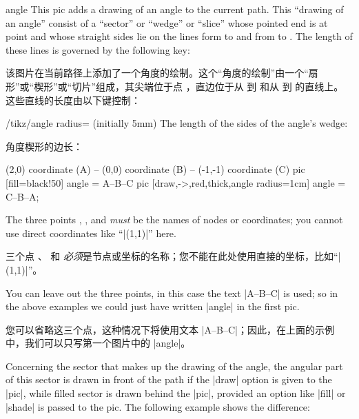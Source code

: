 \begin{pictype}{angle}{}
    This pic adds a drawing of an angle to the current path. This ``drawing of
    an angle'' consist of a ``sector'' or ``wedge'' or ``slice'' whose pointed
    end is at point  and whose straight sides lie on the lines form
     to  and from  to . The length of these
    lines is governed by the following key:
    
    该图片在当前路径上添加了一个角度的绘制。这个“角度的绘制”由一个“扇形”或“楔形”或“切片”组成，其尖端位于点 ，直边位于从  到  和从  到  的直线上。这些直线的长度由以下键控制：


    \begin{key}{/tikz/angle radius= (initially 5mm)}
        The length of the sides of the angle's wedge:
        
        角度楔形的边长：


\begin{codeexample}[preamble={\usetikzlibrary{angles}}]
\tikz \draw (2,0) coordinate (A) -- (0,0) coordinate (B)
         -- (-1,-1) coordinate (C)
           pic [fill=black!50]                      {angle = A--B--C}
           pic [draw,->,red,thick,angle radius=1cm] {angle = C--B--A};
\end{codeexample}
    \end{key}

    The three points , , and  \emph{must} be the names
    of nodes or coordinates; you cannot use direct coordinates like ``|(1,1)|''
    here.

    三个点 、 和  \emph{必须}是节点或坐标的名称；您不能在此处使用直接的坐标，比如“|(1,1)|”。

    You can leave out the three points, in this case the text |A--B--C| is
    used; so in the above examples we could just have written |{angle}| in the
    first pic.

    您可以省略这三个点，这种情况下将使用文本 |A--B--C|；因此，在上面的示例中，我们可以只写第一个图片中的 |{angle}|。

    Concerning the sector that makes up the drawing of the angle, the angular
    part of this sector is drawn in front of the path if the |draw| option is
    given to the |pic|, while filled sector is drawn behind the |pic|, provided
    an option like |fill| or |shade| is passed to the pic. The following
    example shows the difference:
    

\end{pictype}

